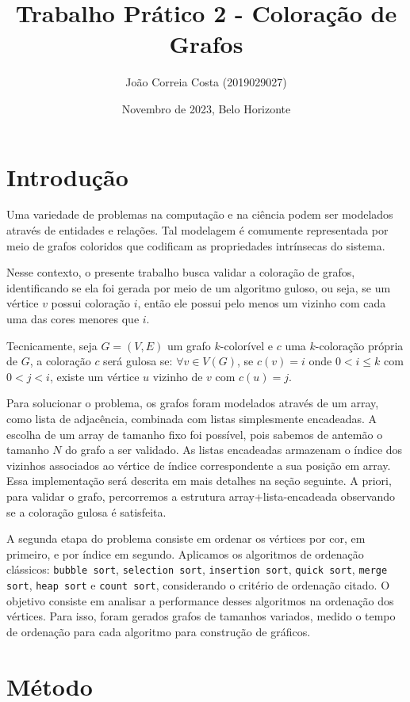 \documentclass{article}
\title{Trabalho Prático 2 - Coloração de Grafos}
\author{João Correia Costa (2019029027)}
\date{Novembro de 2023, Belo Horizonte}
\begin{document}
\maketitle

\section{Introdução}

Uma variedade de problemas na computação e na ciência podem ser modelados através de entidades e relações. Tal modelagem é comumente representada por meio de grafos coloridos que codificam as propriedades intrínsecas do sistema.

Nesse contexto, o presente trabalho busca validar a coloração de grafos, identificando se ela foi gerada por meio de um algoritmo guloso, ou seja, se um vértice \(v\) possui coloração \(i\), então ele possui pelo menos um vizinho com cada uma das cores menores que \(i\).

Tecnicamente, seja \(G = (V, E)\) um grafo \(k\)-colorível e \(c\) uma \(k\)-coloração própria de \(G\), a coloração \(c\) será gulosa se: \(\forall v \in V(G)\), se \(c(v) = i\) onde \(0 < i \leq k\) com \(0 < j < i\), existe um vértice \(u\) vizinho de \(v\) com \(c(u) = j\).

Para solucionar o problema, os grafos foram modelados através de um array, como lista de adjacência, combinada com listas simplesmente encadeadas. A escolha de um array de tamanho fixo foi possível, pois sabemos de antemão o tamanho \(N\) do grafo a ser validado. As listas encadeadas armazenam o índice dos vizinhos associados ao vértice de índice correspondente a sua posição em array. Essa implementação será descrita em mais detalhes na seção seguinte. A priori, para validar o grafo, percorremos a estrutura array+lista-encadeada observando se a coloração gulosa é satisfeita.

A segunda etapa do problema consiste em ordenar os vértices por cor, em primeiro, e por índice em segundo. Aplicamos os algoritmos de ordenação clássicos:  \texttt{bubble sort}, \texttt{selection sort}, \texttt{insertion sort}, \texttt{quick sort}, \texttt{merge sort}, \texttt{heap sort} e \texttt{count sort}, considerando o critério de ordenação citado. O objetivo consiste em analisar a performance desses algoritmos na ordenação dos vértices. Para isso, foram gerados grafos de tamanhos variados, medido o tempo de ordenação para cada algoritmo para construção de gráficos.


\section{Método}
\end{document}
